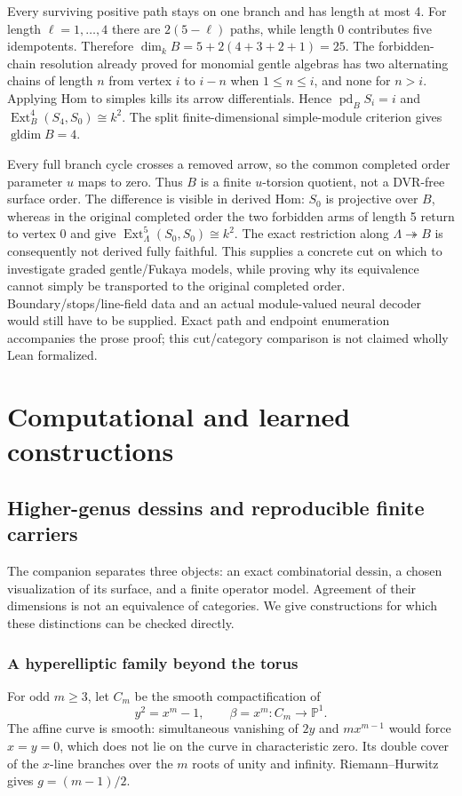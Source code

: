 \documentclass[11pt,oneside,openany]{book}
\theoremstyle{definition}\newtheorem{definition}[theorem]{Definition}
\theoremstyle{remark}\newtheorem{remark}[theorem]{Remark}
\begin{document}
Every surviving positive path stays on one branch and has length at most 4.
For length $\ell=1,\ldots,4$ there are $2(5-\ell)$ paths, while length 0
contributes five idempotents. Therefore $\dim_kB=5+2(4+3+2+1)=25$.
The forbidden-chain resolution already proved for monomial gentle algebras
has two alternating chains of length $ n $ from vertex $ i $ to $ i-n $ when
$1\le n\le i $, and none for $ n>i $. Applying Hom to simples kills its
arrow differentials. Hence $\operatorname{pd}_B S_i=i $ and
$\operatorname{Ext}^4_B(S_4,S_0)\cong k^2$. The split finite-dimensional
simple-module criterion gives $\operatorname{gldim}B=4$.

Every full branch cycle crosses a removed arrow, so the common completed
order parameter $ u $ maps to zero. Thus $ B $ is a finite $ u $-torsion quotient,
not a DVR-free surface order. The difference is visible in derived Hom:
$ S_0$ is projective over $ B $, whereas in the original completed order the
two forbidden arms of length 5 return to vertex 0 and give
$\operatorname{Ext}^5_\Lambda(S_0,S_0)\cong k^2$. The exact restriction along
$\Lambda\twoheadrightarrow B $ is consequently not derived fully faithful.
This supplies a concrete cut on which to investigate graded gentle/Fukaya
models, while proving why its equivalence cannot simply be transported to
the original completed order. Boundary/stops/line-field data and an actual
module-valued neural decoder would still have to be supplied. Exact path
and endpoint enumeration accompanies the prose proof; this cut/category
comparison is not claimed wholly Lean formalized.


\part{Computational and learned constructions}
\chapter{Higher-genus dessins and reproducible finite carriers}
\label{book:computations}
The companion separates three objects: an exact combinatorial dessin, a chosen visualization of its surface, and a finite operator model. Agreement of their dimensions is not an equivalence of categories. We give constructions for which these distinctions can be checked directly.

\section{A hyperelliptic family beyond the torus}
For odd $m\ge3$, let $C_m$ be the smooth compactification of
\[
 y^2=x^m-1,\qquad \beta=x^m:C_m\longrightarrow\mathbb P^1.
\]
The affine curve is smooth: simultaneous vanishing of $2y$ and $mx^{m-1}$ would force $x=y=0$, which does not lie on the curve in characteristic zero. Its double cover of the $x$-line branches over the $m$ roots of unity and infinity. Riemann--Hurwitz gives $g=(m-1)/2$.
\end{document}
